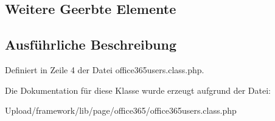 \subsection*{Weitere Geerbte Elemente}


\subsection{Ausführliche Beschreibung}


Definiert in Zeile 4 der Datei office365users.\+class.\+php.



Die Dokumentation für diese Klasse wurde erzeugt aufgrund der Datei\+:\begin{DoxyCompactItemize}
\item 
Upload/framework/lib/page/office365/office365users.\+class.\+php\end{DoxyCompactItemize}
